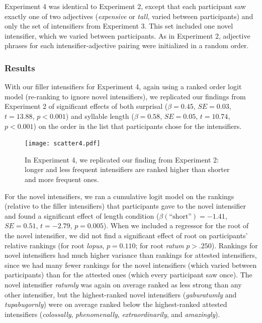\documentclass[10pt,letterpaper]{article}
\newcommand{\w}[1]{\emph{#1}}
\begin{document}
Experiment 4 was identical to Experiment 2, except that each participant saw exactly one of two adjectives (\w{expensive} or \w{tall}, varied between participants) and only the set of intensifiers from Experiment 3. This set included one novel intensifier, which we varied between participants. As in Experiment 2, adjective phrases for each intensifier-adjective pairing were initialized in a random order.

\subsubsection{Results}
With our filler intensifiers for Experiment 4, again using a ranked order logit model (re-ranking to ignore novel intensifiers), we replicated our findings from Experiment 2 of significant effects of both surprisal ($\beta=0.45$, $SE=0.03$, $t=13.88$, $p<0.001$)
and syllable length ($\beta=0.58$, $SE=0.05$, $t=10.74$, $p<0.001$) on the order in the list that participants chose for the intensifiers.

\begin{figure}[hbt]
\begin{center}
\texttt{[image: scatter4.pdf]}
\end{center}
\caption{In Experiment 4, we replicated our finding from Experiment 2: longer and less frequent intensifiers are ranked higher than shorter and more frequent ones.} 
\label{exp4_replication}
\end{figure}

For the novel intensifiers, we ran a cumulative logit model on the rankings (relative to the filler intensifiers) that participants gave to the novel intensifier and found a significant effect of length condition ($\beta(\mbox{``short''})=-1.41$, $SE=0.51$, $t=-2.79$, $p=0.005$).
When we included a regressor for the root of the novel intensifier, we did not find a significant effect of root on participants' relative rankings (for root \w{lopus}, $p=0.110$; for root \w{ratum} $p>.250$).
Rankings for novel intensifiers had much higher variance than rankings for attested intensifiers, since we had many fewer rankings for the novel intensifiers (which varied between participants) than for the attested ones (which every participant saw once). The novel intensifier \w{ratumly} was again on average ranked as less strong than any other intensifier, but the highest-ranked novel intensifiers (\w{gaburatumly} and \w{tupabugornly}) were on average ranked below the highest-ranked attested intensifiers (\w{colossally}, \w{phenomenally}, \w{extraordinarily}, and \w{amazingly}).
\end{document}
